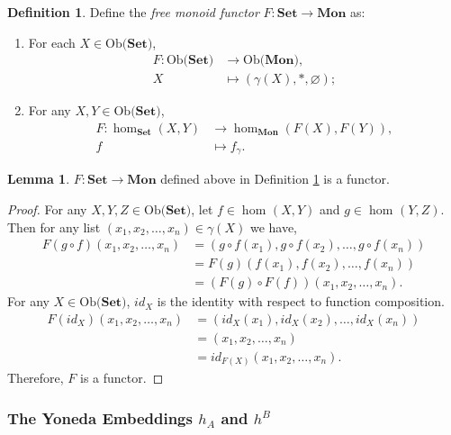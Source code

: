 \documentclass[11pt,a4paper]{article}
\theoremstyle{definition}
\newtheorem{lemma}[thm]{Lemma}
\newtheorem{definition}[thm]{Definition}
\newcommand\ho[3][]{\hom_{#1}(#2,#3)}
\newcommand\ob[1]{\mathrm{Ob(}#1\mathrm{)}}
\numberwithin{equation}{section}
\begin{document}
\begin{definition}
\label{def:freefunctmon}
Define the \emph{free monoid functor} $F\colon \mathbf{Set}\rightarrow\mathbf{Mon}$ as:
\begin{enumerate}
    \item For each $X\in\ob{\mathbf{Set}}$,
    \begin{align*}
        F\colon\ob{\mathbf{Set}}&\rightarrow\ob{\mathbf{Mon}},\\
        X&\mapsto(\gamma(X),*,\varnothing);
    \end{align*}
    \item For any $X,Y\in\ob{\mathbf{Set}}$,
    \begin{align*}
        F\colon \ho[\mathbf{Set}]{X}{Y}&\rightarrow\ho[\mathbf{Mon}]{F(X)}{F(Y)},\\
        f&\mapsto f_{\gamma}.
    \end{align*}
\end{enumerate}
\end{definition}
\begin{lemma}
    $F\colon \mathbf{Set}\rightarrow\mathbf{Mon}$ defined above in Definition \ref{def:freefunctmon} is a functor.
\end{lemma}
\begin{proof}
For any $X,Y,Z\in\ob{\mathbf{Set}}$, let $f\in\ho{X}{Y}$ and $g\in\ho{Y}{Z}$. Then for any list $(x_{1},x_{2},\dots,x_{n})\in\gamma(X)$ we have,
\begin{align*}
    F(g\circ f)(x_{1},x_{2},\dots,x_{n}) &= (g\circ f(x_{1}),g\circ f(x_{2}),\dots,g\circ f(x_{n}))\\
    &= F(g)(f(x_{1}),f(x_{2}),\dots,f(x_{n}))\\
    &= (F(g)\circ F(f))(x_{1},x_{2},\dots,x_{n}).
\end{align*}
For any $X\in\ob{\mathbf{Set}}$, $id_{X}$ is the identity with respect to function composition. 
\begin{align*}
    F(id_{X})(x_{1},x_{2},\dots,x_{n}) &= (id_{X}(x_{1}),id_{X}(x_{2}),\dots,id_{X}(x_{n}))\\
    &= (x_{1},x_{2},\dots,x_{n})\\
    &= id_{F(X)}(x_{1},x_{2},\dots,x_{n}).
\end{align*}
Therefore, $F$ is a functor.
\end{proof}

\subsubsection{The Yoneda Embeddings $h_A$ and $h^B$}
\label{sss:yonedaembeddings}
\end{document}
